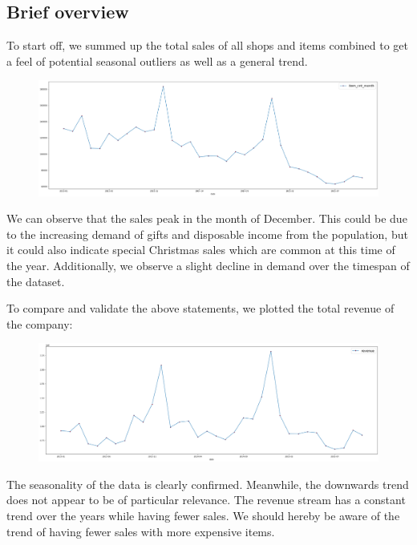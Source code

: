 \subsection{Brief overview}

To start off, we summed up the total sales of all shops and items combined to get a feel of potential seasonal outliers as well as a general trend.

\begin{figure}[h]
  \centering
  \includegraphics[width=0.9\linewidth]{external_content/graphs/total_sales.png}
  \captionsetup{justification=centering}
  \label{fig:total_sales}
\end{figure}


We can observe that the sales peak in the month of December. This could be due to the increasing demand of gifts and disposable income from the population, but it could also indicate special Christmas sales which are common at this time of the year. Additionally, we observe a slight decline in demand over the timespan of the dataset.

To compare and validate the above statements, we plotted the total revenue of the company:

\begin{figure}[h]
  \centering
  \includegraphics[width=0.9\linewidth]{external_content/graphs/total_revenue.png}
  \captionsetup{justification=centering}
  \label{fig:total_revenue}
\end{figure}

The seasonality of the data is clearly confirmed. Meanwhile, the downwards trend does not appear to be of particular relevance. The revenue stream has a constant trend over the years while having fewer sales. We should hereby be aware of the trend of having fewer sales with more expensive items.

